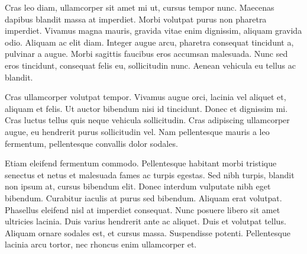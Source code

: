 Cras leo diam, ullamcorper sit amet mi ut, cursus tempor nunc. Maecenas dapibus blandit massa at imperdiet. Morbi volutpat purus non pharetra imperdiet. Vivamus magna mauris, gravida vitae enim dignissim, aliquam gravida odio. Aliquam ac elit diam. Integer augue arcu, pharetra consequat tincidunt a, pulvinar a augue. Morbi sagittis faucibus eros accumsan malesuada. Nunc sed eros tincidunt, consequat felis eu, sollicitudin nunc. Aenean vehicula eu tellus ac blandit.

Cras ullamcorper volutpat tempor. Vivamus augue orci, lacinia vel aliquet et, aliquam et felis. Ut auctor bibendum nisi id tincidunt. Donec et dignissim mi. Cras luctus tellus quis neque vehicula sollicitudin. Cras adipiscing ullamcorper augue, eu hendrerit purus sollicitudin vel. Nam pellentesque mauris a leo fermentum, pellentesque convallis dolor sodales.

Etiam eleifend fermentum commodo. Pellentesque habitant morbi tristique senectus et netus et malesuada fames ac turpis egestas. Sed nibh turpis, blandit non ipsum at, cursus bibendum elit. Donec interdum vulputate nibh eget bibendum. Curabitur iaculis at purus sed bibendum. Aliquam erat volutpat. Phasellus eleifend nisl at imperdiet consequat. Nunc posuere libero sit amet ultricies lacinia. Duis varius hendrerit ante ac aliquet. Duis et volutpat tellus. Aliquam ornare sodales est, et cursus massa. Suspendisse potenti. Pellentesque lacinia arcu tortor, nec rhoncus enim ullamcorper et.